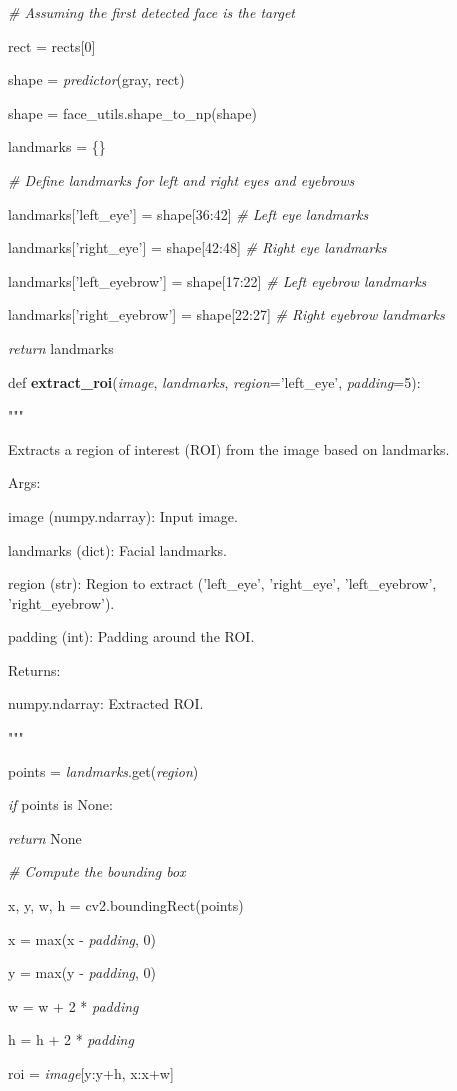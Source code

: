 \documentclass[
]{article}
\begin{document}
\emph{\# Assuming the first detected face is the target}

rect = rects{[}0{]}

shape = \emph{predictor}(gray, rect)

shape = face\_utils.shape\_to\_np(shape)

landmarks = \{\}

\emph{\# Define landmarks for left and right eyes and eyebrows}

landmarks{[}'left\_eye'{]} = shape{[}36:42{]} \emph{\# Left eye landmarks}

landmarks{[}'right\_eye'{]} = shape{[}42:48{]} \emph{\# Right eye landmarks}

landmarks{[}'left\_eyebrow'{]} = shape{[}17:22{]} \emph{\# Left eyebrow landmarks}

landmarks{[}'right\_eyebrow'{]} = shape{[}22:27{]} \emph{\# Right eyebrow landmarks}

\emph{return} landmarks

def \textbf{extract\_roi}(\emph{image}, \emph{landmarks}, \emph{region}='left\_eye', \emph{padding}=5):

"""

Extracts a region of interest (ROI) from the image based on landmarks.

Args:

image (numpy.ndarray): Input image.

landmarks (dict): Facial landmarks.

region (str): Region to extract ('left\_eye', 'right\_eye', 'left\_eyebrow', 'right\_eyebrow').

padding (int): Padding around the ROI.

Returns:

numpy.ndarray: Extracted ROI.

"""

points = \emph{landmarks}.get(\emph{region})

\emph{if} points is None:

\emph{return} None

\emph{\# Compute the bounding box}

x, y, w, h = cv2.boundingRect(points)

x = max(x - \emph{padding}, 0)

y = max(y - \emph{padding}, 0)

w = w + 2 * \emph{padding}

h = h + 2 * \emph{padding}

roi = \emph{image}{[}y:y+h, x:x+w{]}
\end{document}
